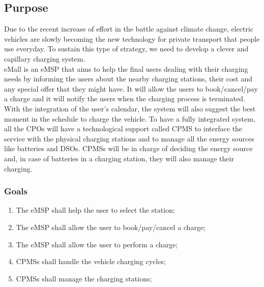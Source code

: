 


\subsection{Purpose}
Due to the recent increase of effort in the battle against climate change, electric vehicles are slowly becoming the new technology for private transport that   people use everyday.
To sustain this type of strategy, we need to develop a clever and capillary charging system.\\
\ac{eMall} is an \ac{eMSP} that aims to help the final users dealing with their charging needs by informing the users about the nearby charging stations, their cost and any special offer that they might have.
It will allow the users to book/cancel/pay a charge and it will notify the users when the charging process is terminated.\\
With the integration of the user's calendar, the system will also suggest the best moment in the schedule to charge the vehicle.
To have a fully integrated system, all the \acp{CPO} will have a technological support called \ac{CPMS} to interface the service with the physical charging stations and to manage all the energy sources like batteries and \acp{DSO}.
\acp{CPMS} will be in charge of deciding the energy source and, in case of batteries in a charging station, they will also manage their charging.
\subsubsection{Goals}
%
\begin{enumerate}[label=\textbf{G\arabic*}]
    \item The \ac{eMSP} shall help the user to select the station; \label{goal:eMSP-helps-selecting}
    \item The \ac{eMSP} shall allow the user to book/pay/cancel a charge; \label{goal:eMSP-booking-charge}
    \item The \ac{eMSP} shall allow the user to perform a charge; \label{goal:eMSP-allow-charge}
    \item \acp{CPMS} shall handle the vehicle charging cycles; \label{goal:CPMS-handles-charge}
    \item \acp{CPMS} shall manage the charging stations; \label{goal:CPMS-manage-station}
\end{enumerate}

